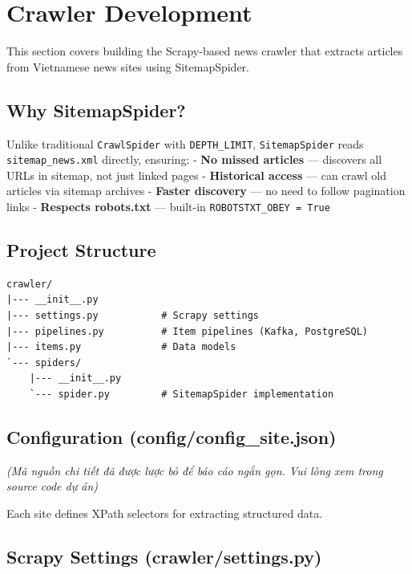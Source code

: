 \hypertarget{crawler-development}{%
\section{Crawler Development}}

This section covers building the Scrapy-based news crawler that extracts
articles from Vietnamese news sites using SitemapSpider.

\hypertarget{why-sitemapspider}{%
\subsection{Why SitemapSpider?}}

Unlike traditional \texttt{CrawlSpider} with \texttt{DEPTH\_LIMIT},
\texttt{SitemapSpider} reads \texttt{sitemap\_news.xml} directly,
ensuring: - \textbf{No missed articles} --- discovers all URLs in
sitemap, not just linked pages - \textbf{Historical access} --- can
crawl old articles via sitemap archives - \textbf{Faster discovery} ---
no need to follow pagination links - \textbf{Respects robots.txt} ---
built-in \texttt{ROBOTSTXT\_OBEY\ =\ True}

\hypertarget{project-structure}{%
\subsection{Project Structure}}

\begin{verbatim}
crawler/
|--- __init__.py
|--- settings.py           # Scrapy settings
|--- pipelines.py          # Item pipelines (Kafka, PostgreSQL)
|--- items.py              # Data models
`--- spiders/
    |--- __init__.py
    `--- spider.py         # SitemapSpider implementation
\end{verbatim}

\hypertarget{configuration-configconfig_site.json}{%
\subsection{Configuration
(config/config\_site.json)}}

\emph{(Mã nguồn chi tiết đã được lược bỏ để báo cáo ngắn gọn. Vui lòng
xem trong source code dự án)}

Each site defines XPath selectors for extracting structured data.

\hypertarget{scrapy-settings-crawlersettings.py}{%
\subsection{Scrapy Settings
(crawler/settings.py)}}

